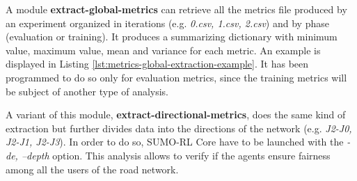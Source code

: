 \begin{table}[H]
  \label{tbl:metrics-file-example}
\end{table}

A module \textbf{extract-global-metrics} can retrieve all the metrics file produced by an experiment organized in iterations (e.g. \textit{0.csv, 1.csv, 2.csv}) and by phase (evaluation or training).
It produces a summarizing dictionary with minimum value, maximum value, mean and variance for each metric.
An example is displayed in Listing \ref{lst:metrics-global-extraction-example}.
It has been programmed to do so only for evaluation metrics, since the training metrics will be subject of another type of analysis.

A variant of this module, \textbf{extract-directional-metrics}, does the same kind of extraction but further divides data into the directions of the network (e.g. \textit{J2-J0, J2-J1, J2-J3}).
In order to do so, SUMO-RL Core have to be launched with the \textit{-de, --depth} option.
This analysis allows to verify if the agents ensure fairness among all the users of the road network.

